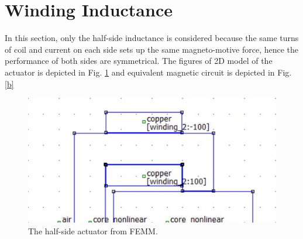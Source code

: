 \documentclass[a4paper]{IEEEtran}
\begin{document}
\section{Winding Inductance}
In this section, only the half-side inductance is considered because the same turns of coil and current on each side sets up the same magneto-motive force, hence the performance of both sides are symmetrical. 
The figures of 2D model of the actuator is depicted in Fig. \ref{a} and equivalent magnetic circuit is depicted in Fig. \ref{b}
\begin{figure}[H]
\begin{centering}
\includegraphics[scale=0.7]{a.jpg}
\par\end{centering}   
\caption{The half-side actuator from FEMM.\label{a}}
\end{figure}  
\end{document}
